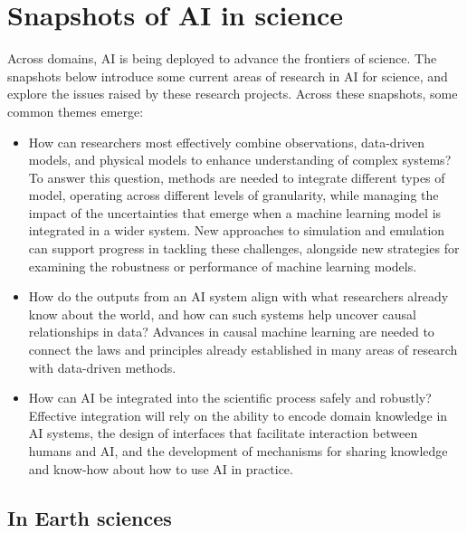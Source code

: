\section{Snapshots of AI in science}\label{snapshots-of-ai-in-science}

Across domains, AI is being deployed to advance the frontiers of
science. The snapshots below introduce some current areas of research in
AI for science, and explore the issues raised by these research
projects. Across these snapshots, some common themes emerge:

\begin{itemize}
\item
  How can researchers most effectively combine observations, data-driven
  models, and physical models to enhance understanding of complex
  systems? To answer this question, methods are needed to integrate
  different types of model, operating across different levels of
  granularity, while managing the impact of the uncertainties that
  emerge when a machine learning model is integrated in a wider system.
  New approaches to simulation and emulation can support progress in
  tackling these challenges, alongside new strategies for examining the
  robustness or performance of machine learning models.
\item
  How do the outputs from an AI system align with what researchers
  already know about the world, and how can such systems help uncover
  causal relationships in data? Advances in causal machine learning are
  needed to connect the laws and principles already established in many
  areas of research with data-driven methods.
\item
  How can AI be integrated into the scientific process safely and
  robustly? Effective integration will rely on the ability to encode
  domain knowledge in AI systems, the design of interfaces that
  facilitate interaction between humans and AI, and the development of
  mechanisms for sharing knowledge and know-how about how to use AI in
  practice.
\end{itemize}


\subsection{In Earth sciences}\label{in-earth-sciences}

